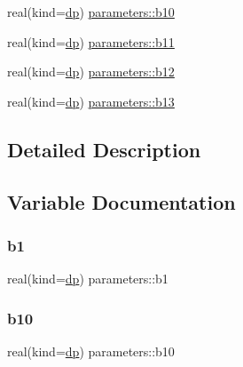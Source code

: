 \begin{DoxyCompactItemize}
\item 
real(kind=\mbox{\hyperlink{namespaceparameters_a52f8c6351fd79345d8811e065bcbbb37}{dp}}) \mbox{\hyperlink{group__SKYRME__COEFFS_ga8810e38b014109a9b8eab1862dcc48d4}{parameters\+::b10}}
\item 
real(kind=\mbox{\hyperlink{namespaceparameters_a52f8c6351fd79345d8811e065bcbbb37}{dp}}) \mbox{\hyperlink{group__SKYRME__COEFFS_ga1590f4a1a23ab65ab7aebe0422add4d3}{parameters\+::b11}}
\item 
real(kind=\mbox{\hyperlink{namespaceparameters_a52f8c6351fd79345d8811e065bcbbb37}{dp}}) \mbox{\hyperlink{group__SKYRME__COEFFS_gad5af273df649cc4a1f0efdbb3a21078c}{parameters\+::b12}}
\item 
real(kind=\mbox{\hyperlink{namespaceparameters_a52f8c6351fd79345d8811e065bcbbb37}{dp}}) \mbox{\hyperlink{group__SKYRME__COEFFS_ga0cfa3a610d32b67d583a86f8b6e19c47}{parameters\+::b13}}
\end{DoxyCompactItemize}


\subsection{Detailed Description}


\subsection{Variable Documentation}
\mbox{\label{group__SKYRME__COEFFS_ga370f8790e2b550acb651df944341c38a}} 
\subsubsection{\texorpdfstring{b1}{b1}}
{\footnotesize\ttfamily real(kind=\mbox{\hyperlink{namespaceparameters_a52f8c6351fd79345d8811e065bcbbb37}{dp}}) parameters\+::b1}

\mbox{\label{group__SKYRME__COEFFS_ga8810e38b014109a9b8eab1862dcc48d4}} 
\subsubsection{\texorpdfstring{b10}{b10}}
{\footnotesize\ttfamily real(kind=\mbox{\hyperlink{namespaceparameters_a52f8c6351fd79345d8811e065bcbbb37}{dp}}) parameters\+::b10}

